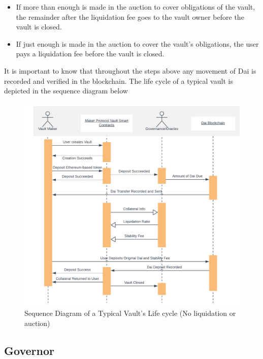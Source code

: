 \documentclass[bsc,frontabs,singlespacing,parskip,deptreport]{infthesis}
\begin{document}
\begin{itemize}
        \item If more than enough is made in the auction to cover obligations of the vault, the remainder after the liquidation fee goes to the vault owner before the vault is closed. 
        \item If just enough is made in the auction to cover the vault's obligations, the user pays a liquidation fee before the vault is closed. 
    \end{itemize}
    \smallbreak \noindent
    It is important to know that throughout the steps above any movement of Dai is recorded and verified in the blockchain. The life cycle of a typical vault is depicted in the sequence diagram below
    \begin{figure}[h]
            \centering
         \includegraphics[width=\linewidth]{Images and Figures/Sequence Diagram Typical Vault.png}
              \caption{Sequence Diagram of a Typical Vault's Life cycle (No liquidation or auction)}
    \end{figure}
    \subsection{Governor}
\end{document}
